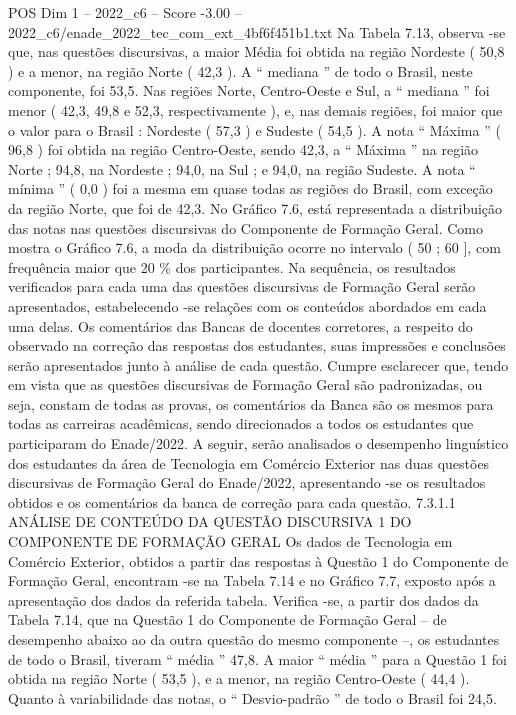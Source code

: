 \begin{textsample}{POS Dim 1 – 2022\_c6 – Score -3.00 – 2022\_c6/enade\_2022\_tec\_com\_ext\_4bf6f451b1.txt}
Na Tabela 7.13, observa -se que, nas questões discursivas, a maior Média foi obtida na região Nordeste ( 50,8 ) e a menor, na região Norte ( 42,3 ).
A “ mediana ” de todo o Brasil, neste componente, foi 53,5.
Nas regiões Norte, Centro-Oeste e Sul, a “ mediana ” foi menor ( 42,3, 49,8 e 52,3, respectivamente ), e, nas demais regiões, foi maior que o valor para o Brasil : Nordeste ( 57,3 ) e Sudeste ( 54,5 ).
A nota “ Máxima ” ( 96,8 ) foi obtida na região Centro-Oeste, sendo 42,3, a “ Máxima ” na região Norte ; 94,8, na Nordeste ; 94,0, na Sul ; e 94,0, na região Sudeste.
A nota “ mínima ” ( 0,0 ) foi a mesma em quase todas as regiões do Brasil, com exceção da região Norte, que foi de 42,3.
No Gráfico 7.6, está representada a distribuição das notas nas questões discursivas do Componente de Formação Geral.
Como mostra o Gráfico 7.6, a moda da distribuição ocorre no intervalo ( 50 ; 60 ], com frequência maior que 20 \% dos participantes.
Na sequência, os resultados verificados para cada uma das questões discursivas de Formação Geral serão apresentados, estabelecendo -se relações com os conteúdos abordados em cada uma delas.
Os comentários das Bancas de docentes corretores, a respeito do observado na correção das respostas dos estudantes, suas impressões e conclusões serão apresentados junto à análise de cada questão.
Cumpre esclarecer que, tendo em vista que as questões discursivas de Formação Geral são padronizadas, ou seja, constam de todas as provas, os comentários da Banca são os mesmos para todas as carreiras acadêmicas, sendo direcionados a todos os estudantes que participaram do Enade/2022.
A seguir, serão analisados o desempenho linguístico dos estudantes da área de Tecnologia em Comércio Exterior nas duas questões discursivas de Formação Geral do Enade/2022, apresentando -se os resultados obtidos e os comentários da banca de correção para cada questão. 7.3.1.1 ANÁLISE DE CONTEÚDO DA QUESTÃO DISCURSIVA 1 DO COMPONENTE DE FORMAÇÃO GERAL Os dados de Tecnologia em Comércio Exterior, obtidos a partir das respostas à Questão 1 do Componente de Formação Geral, encontram -se na Tabela 7.14 e no Gráfico 7.7, exposto após a apresentação dos dados da referida tabela.
Verifica -se, a partir dos dados da Tabela 7.14, que na Questão 1 do Componente de Formação Geral – de desempenho abaixo ao da outra questão do mesmo componente –, os estudantes de todo o Brasil, tiveram “ média ” 47,8.
A maior “ média ” para a Questão 1 foi obtida na região Norte ( 53,5 ), e a menor, na região Centro-Oeste ( 44,4 ).
Quanto à variabilidade das notas, o “ Desvio-padrão ” de todo o Brasil foi 24,5.

\end{textsample}
